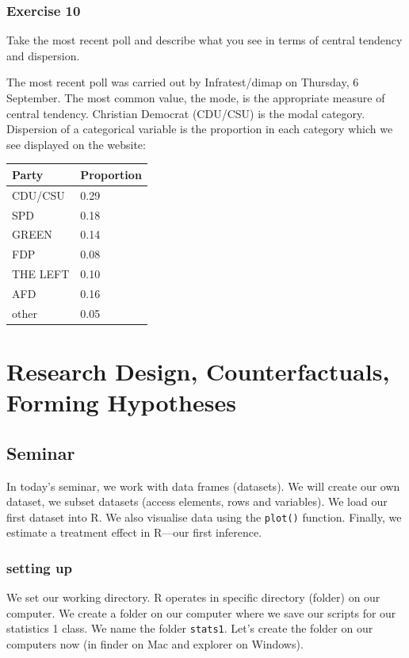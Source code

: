 \documentclass[]{book}
\theoremstyle{definition}
\theoremstyle{definition}
\theoremstyle{definition}
\theoremstyle{remark}
\begin{document}
\subsection{Exercise 10}\label{exercise-10}

Take the most recent poll and describe what you see in terms of central
tendency and dispersion.

The most recent poll was carried out by Infratest/dimap on Thursday, 6
September. The most common value, the mode, is the appropriate measure
of central tendency. Christian Democrat (CDU/CSU) is the modal category.
Dispersion of a categorical variable is the proportion in each category
which we see displayed on the website:

\begin{longtable}[]{@{}ll@{}}
\toprule
Party & Proportion\tabularnewline
\midrule
\endhead
CDU/CSU & 0.29\tabularnewline
SPD & 0.18\tabularnewline
GREEN & 0.14\tabularnewline
FDP & 0.08\tabularnewline
THE LEFT & 0.10\tabularnewline
AFD & 0.16\tabularnewline
other & 0.05\tabularnewline
\bottomrule
\end{longtable}

\chapter{Research Design, Counterfactuals, Forming
Hypotheses}\label{research-design-counterfactuals-forming-hypotheses}

\section{Seminar}\label{seminar-1}

In today's seminar, we work with data frames (datasets). We will create
our own dataset, we subset datasets (access elements, rows and
variables). We load our first dataset into R. We also visualise data
using the \texttt{plot()} function. Finally, we estimate a treatment
effect in R---our first inference.

\subsection{setting up}\label{setting-up}

We set our working directory. R operates in specific directory (folder)
on our computer. We create a folder on our computer where we save our
scripts for our statistics 1 class. We name the folder \texttt{stats1}.
Let's create the folder on our computers now (in finder on Mac and
explorer on Windows).
\end{document}
